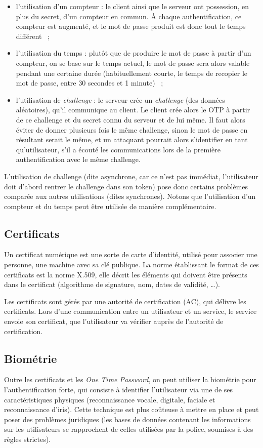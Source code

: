 \begin{itemize}
  \item l'utilisation d'un compteur : le client ainsi que le
serveur ont possession, en plus du secret, d'un compteur en
commun. À chaque authentification, ce compteur est augmenté, et le
mot de passe produit est donc tout le temps différent ~;
  \item l'utilisation du temps : plutôt que de produire le mot de
passe à partir d'un compteur, on se base sur le temps actuel, le
mot de passe sera alors valable pendant une certaine durée
(habituellement courte, le temps de recopier le mot de passe, 
 entre 30 secondes et 1 minute) ~;
  \item l'utilisation de \emph{challenge} : le serveur crée un
\emph{challenge} (des données aléatoires), qu'il communique au
client. Le client crée alors le OTP à partir de ce challenge et du
secret connu du serveur et de lui même. Il faut alors éviter de
donner plusieurs fois le même challenge, sinon le mot de passe en
résultant serait le même, et un attaquant pourrait alors
s'identifier en tant qu'utilisateur, s'il a écouté les
communications lors de la première authentification avec le même
challenge. 
\\
\end{itemize}

L'utilisation de challenge (dite asynchrone, car ce n'est pas
immédiat, l'utilisateur doit d'abord rentrer le challenge dans 
son token) pose donc certains problèmes comparée aux autres 
utilisations (dites synchrones). Notons que 
l'utilisation d'un compteur et du temps peut être utilisée de
manière complémentaire.


\subsection{Certificats}
Un certificat numérique est une sorte de carte d'identité,
utilisé pour associer une personne, une machine avec sa clé
publique.
La norme établissant le format de ces certificats est la norme
X.509, elle décrit les éléments qui doivent être présents dans le
certificat (algorithme de signature, nom, dates de validité, …).

Les certificats sont gérés par une autorité de certification (AC),
qui délivre les certificats.
Lors d'une communication entre un utilisateur et un service,
le service envoie son certificat, que l'utilisateur va vérifier
auprès de l'autorité de certification.


\subsection{Biométrie}
Outre les certificats et les \emph{One Time Password}, on peut
utiliser la biométrie pour l'authentification forte, qui consiste
à identifier l'utilisateur via une de ses caractéristiques
physiques (reconnaissance vocale, digitale, faciale et
reconnaissance d'iris).
Cette technique est plus coûteuse à mettre en place et peut poser
des problèmes juridiques (les bases de données contenant les
informations sur les utilisateurs se rapprochent de celles
utilisées par la police, soumises à des règles strictes).
